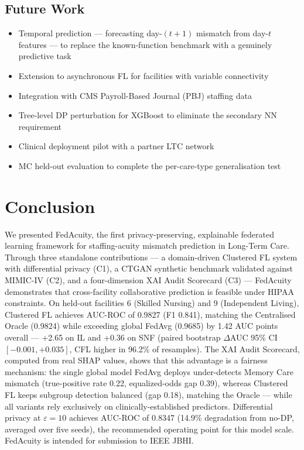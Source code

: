 \documentclass[journal]{IEEEtran}
\begin{document}
\subsection{Future Work}
\begin{itemize}
  \item Temporal prediction --- forecasting day-$(t{+}1)$ mismatch from day-$t$
  features --- to replace the known-function benchmark with a genuinely
  predictive task
  \item Extension to asynchronous FL for facilities with variable connectivity
  \item Integration with CMS Payroll-Based Journal (PBJ) staffing data
  \item Tree-level DP perturbation for XGBoost to eliminate the secondary NN requirement
  \item Clinical deployment pilot with a partner LTC network
  \item MC held-out evaluation to complete the per-care-type generalisation test
\end{itemize}

\section{Conclusion}
\label{sec:conclusion}

We presented FedAcuity, the first privacy-preserving, explainable federated
learning framework for staffing-acuity mismatch prediction in Long-Term Care.
Through three standalone contributions — a domain-driven Clustered FL system
with differential privacy (C1), a CTGAN synthetic benchmark validated against
MIMIC-IV (C2), and a four-dimension XAI Audit Scorecard (C3) — FedAcuity
demonstrates that cross-facility collaborative prediction is feasible under
HIPAA constraints. On held-out facilities 6 (Skilled Nursing) and 9 (Independent
Living), Clustered FL achieves AUC-ROC of 0.9827 (F1 0.841), matching the
Centralised Oracle (0.9824) while exceeding global FedAvg (0.9685) by 1.42
AUC points overall --- +2.65 on IL and +0.36 on SNF (paired bootstrap
$\Delta$AUC 95\% CI $[-0.001, +0.035]$, CFL higher in 96.2\% of
resamples). The XAI Audit Scorecard, computed from real SHAP values, shows that
this advantage is a fairness mechanism: the single global model FedAvg deploys
under-detects Memory Care mismatch (true-positive rate 0.22, equalized-odds gap
0.39), whereas Clustered FL keeps subgroup detection balanced (gap 0.18), matching
the Oracle --- while all variants rely exclusively on clinically-established
predictors. Differential privacy at $\varepsilon = 10$ achieves AUC-ROC of 0.8347
(14.9\% degradation from no-DP, averaged over five seeds), the recommended
operating point for this model scale. FedAcuity is intended for submission to
IEEE JBHI.
\end{document}
